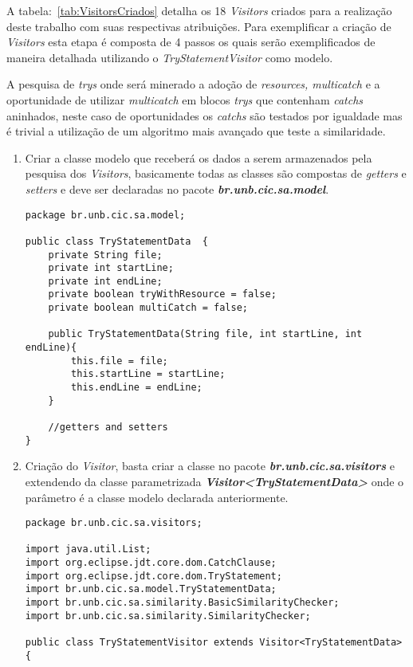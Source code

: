 A tabela:~\ref{tab:VisitorsCriados} detalha os 18 \textit{Visitors} criados para a realização deste trabalho com suas respectivas atribuições. Para exemplificar a criação de \textit{Visitors} esta etapa é composta de 4 passos os quais serão exemplificados de maneira detalhada utilizando o \textit{TryStatementVisitor} como modelo.

A pesquisa de \textit{trys} onde será minerado a adoção de \textit{resources, multicatch} e a oportunidade de utilizar \textit{multicatch} em blocos \textit{trys} que contenham \textit{catchs} aninhados, neste caso de oportunidades os \textit{catchs} são testados por igualdade mas é trivial a utilização de um algoritmo mais avançado que teste a similaridade.

	\begin{enumerate}
		\item Criar a classe modelo que receberá os dados a serem armazenados pela pesquisa dos \textit{Visitors}, basicamente todas as classes são compostas de \textit{getters} e \textit{setters} e deve ser declaradas no pacote  \textit{\textbf{br.unb.cic.sa.model}}.
			\begin{lstlisting}
package br.unb.cic.sa.model;

public class TryStatementData  {
	private String file;
	private int startLine;
	private int endLine;
	private boolean tryWithResource = false;
	private boolean multiCatch = false;
	
	public TryStatementData(String file, int startLine, int endLine){
		this.file = file;
		this.startLine = startLine;
		this.endLine = endLine;
	}
	
	//getters and setters
}
			\end{lstlisting}
			
			
		\item Criação do \textit{Visitor}, basta criar a classe no pacote \textit{\textbf{br.unb.cic.sa.visitors}} e extendendo da classe parametrizada \textit{\textbf{Visitor<TryStatementData>}} onde o parâmetro é a classe modelo declarada anteriormente.
			
			\begin{lstlisting}
package br.unb.cic.sa.visitors;

import java.util.List;
import org.eclipse.jdt.core.dom.CatchClause;
import org.eclipse.jdt.core.dom.TryStatement;
import br.unb.cic.sa.model.TryStatementData;
import br.unb.cic.sa.similarity.BasicSimilarityChecker;
import br.unb.cic.sa.similarity.SimilarityChecker;

public class TryStatementVisitor extends Visitor<TryStatementData> {


\end{lstlisting}
\end{enumerate}
